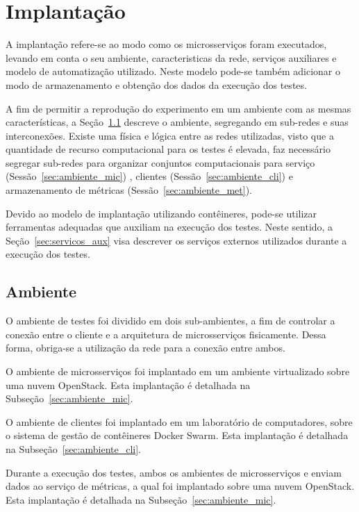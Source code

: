\chapter{Implantação}
\label{cap6}

A implantação refere-se ao modo como os microsserviços foram executados, levando em conta o seu ambiente, caracteristicas da rede, serviços auxiliares e modelo de automatização utilizado.
%
Neste modelo pode-se também adicionar o modo de armazenamento e obtenção dos dados da execução dos testes.

A fim de permitir a reprodução do experimento em um ambiente com as mesmas características, a Seção~\ref{sec:ambiente} descreve o ambiente, segregando em sub-redes e suas interconexões.
%
Existe uma física e lógica entre as redes utilizadas, visto que a quantidade de recurso computacional para os testes é elevada, faz necessário segregar sub-redes para organizar conjuntos computacionais para serviço (Sessão~\ref{sec:ambiente_mic}) , clientes (Sessão~\ref{sec:ambiente_cli}) e armazenamento de métricas (Sessão~\ref{sec:ambiente_met}).

Devido ao modelo de implantação utilizando contêineres, pode-se utilizar ferramentas adequadas que auxiliam na execução dos testes.
%
Neste sentido, a Seção~\ref{sec:servicos_aux} visa descrever os serviços externos utilizados durante a execução dos testes.


\section{Ambiente}
\label{sec:ambiente}

O ambiente de testes foi dividido em dois sub-ambientes, a fim de controlar a conexão entre o cliente e a arquitetura de microsserviços fisicamente. Dessa forma, obriga-se a utilização da rede para a conexão entre ambos.

O ambiente de microsserviços foi implantado em um ambiente virtualizado sobre uma nuvem OpenStack.
%
Esta implantação é detalhada na Subseção~\ref{sec:ambiente_mic}.

O ambiente de clientes foi implantado em um laboratório de computadores, sobre o sistema de gestão de contêineres Docker Swarm.
%
Esta implantação é detalhada na Subseção~\ref{sec:ambiente_cli}.

Durante a execução dos testes, ambos os ambientes  de microsserviços e enviam dados ao serviço de métricas, a qual foi implantado sobre uma nuvem OpenStack.
%
Esta implantação é detalhada na Subseção~\ref{sec:ambiente_mic}.


